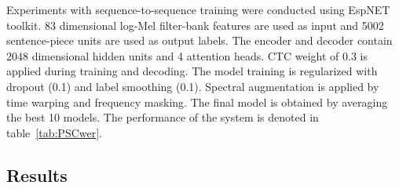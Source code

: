 \documentclass{article}
\begin{document}
Experiments with sequence-to-sequence training were conducted using EspNET~\cite{watanabe2018espnet} toolkit. 83 dimensional log-Mel filter-bank features are used as input and 5002 sentence-piece units are used as output labels. The encoder and decoder contain 2048 dimensional hidden units and 4 attention heads. CTC weight of 0.3 is applied during training and decoding. The model training is regularized with  dropout (0.1) and label smoothing (0.1). Spectral augmentation is applied by time warping and frequency masking. 
The final model is obtained by averaging the best 10 models. The performance of the system is denoted in table~\ref{tab:PSCwer}.  

\subsection{Results}
\label{sec:PSCresults}
\end{document}
